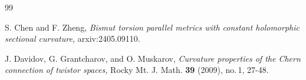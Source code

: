 \documentclass{amsart}
\begin{document}
\begin{thebibliography}{99}


 S. Chen and F. Zheng, \emph {Bismut torsion parallel metrics with constant holomorphic sectional curvature,} arxiv:2405.09110.





 J. Davidov, G. Grantcharov, and O. Muskarov, \emph{Curvature properties of the Chern connection of twistor spaces,}
Rocky Mt. J. Math. {\bf 39} (2009), no.\,1,  27-48.











\end{thebibliography}
\end{document}
